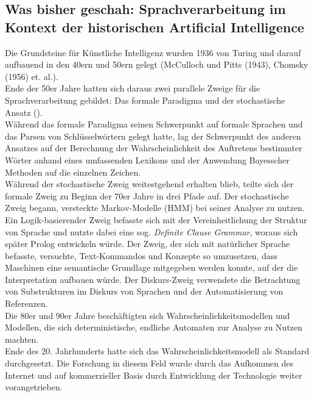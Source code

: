 \documentclass[12pt,twoside]{article}
\theoremstyle{plain}
\theoremstyle{definition}
\theoremstyle{remark}
\begin{document}
	\subsection{Was bisher geschah: Sprachverarbeitung im Kontext der historischen Artificial Intelligence}
	\label{ssec:history}
	Die Grundsteine für Künstliche Intelligenz wurden 1936 von Turing und darauf aufbauend in den 40ern und 50ern gelegt (McCulloch und Pitts (1943), Chomsky (1956) et. al.).\\
	Ende der 50er Jahre hatten sich daraus zwei parallele Zweige für die Sprachverarbeitung gebildet: Das formale Paradigma und der stochastische Ansatz (\cite{Jur2009}).\\
	Während das formale Paradigma seinen Schwerpunkt auf formale Sprachen und das Parsen von Schlüsselwörtern gelegt hatte, lag der Schwerpunkt des anderen Ansatzes auf der Berechnung der Wahrscheinlichkeit des Auftretens bestimmter Wörter anhand eines umfassenden Lexikons und der Anwendung Bayesscher Methoden auf die einzelnen Zeichen.\\
	Während der stochastische Zweig weitestgehend erhalten blieb, teilte sich der formale Zweig zu Beginn der 70er Jahre in drei Pfade auf.
	Der stochastische Zweig begann, versteckte Markov-Modelle (HMM) bei seiner Analyse zu nutzen.
	Ein Logik-basierender Zweig befasste sich mit der Vereinheitlichung der Struktur von Sprache und nutzte dabei eine sog. \textit{Definite Clause Grammar}, woraus sich später Prolog entwickeln würde.
	Der Zweig, der sich mit natürlicher Sprache befasste, versuchte, Text-Kommandos und Konzepte so umzusetzen, dass Maschinen eine semantische Grundlage mitgegeben werden konnte, auf der die Interpretation aufbauen würde.
	Der Diskurs-Zweig verwendete die Betrachtung von Substrukturen im Diskurs von Sprachen und der Automatisierung von Referenzen.\\
	Die 80er und 90er Jahre beschäftigten sich Wahrscheinlichkeitsmodellen und Modellen, die sich deterministische, endliche Automaten zur Analyse zu Nutzen machten.\\
	Ende des 20. Jahrhunderts hatte sich das Wahrscheinlichkeitsmodell als Standard durchgesetzt. Die Forschung in diesem Feld wurde durch das Aufkommen des Internet und auf kommerzieller Basis durch Entwicklung der Technologie weiter vorangetrieben.
\end{document}
